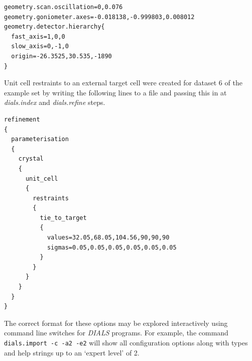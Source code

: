 \documentclass[preprint]{iucr}
\newcommand{\dials}{\emph{DIALS}\xspace}
\newcommand{\dialsindex}{\emph{dials.index}\xspace}
\newcommand{\dialsrefine}{\emph{dials.refine}\xspace}
\begin{document}
\begin{verbatim}
geometry.scan.oscillation=0,0.076
geometry.goniometer.axes=-0.018138,-0.999803,0.008012
geometry.detector.hierarchy{
  fast_axis=1,0,0
  slow_axis=0,-1,0
  origin=-26.3525,30.535,-1890
}
\end{verbatim}

Unit cell restraints to an external target cell were created for dataset 6 of
the example set by writing the following lines to a file and passing this in
at \dialsindex and \dialsrefine steps.

\begin{verbatim}
refinement
{
  parameterisation
  {
    crystal
    {
      unit_cell
      {
        restraints
        {
          tie_to_target
          {
            values=32.05,68.05,104.56,90,90,90
            sigmas=0.05,0.05,0.05,0.05,0.05,0.05
          }
        }
      }
    }
  }
}
\end{verbatim}

The correct format for these options may be explored interactively using
command line switches for \dials programs. For example, the command
\texttt{dials.import -c -a2 -e2} will show all configuration options along with
types and help strings up to an `expert level' of 2.
\end{document}

